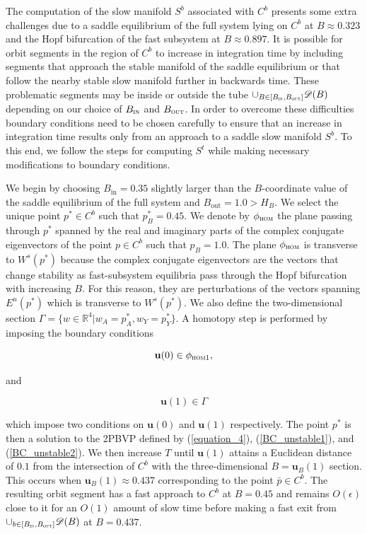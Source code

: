 \documentclass{ws-ijbc}
\begin{document}
The computation of the slow manifold $S^b$ associated with $C^b$ presents some extra challenges due to a saddle equilibrium of the full system lying on $C^b$ at $B \approx 0.323$ and the Hopf bifurcation of the fast subsystem at $B \approx 0.897$.  It is possible for orbit segments in the region of $C^b$ to increase in integration time by including segments that approach the stable manifold of the saddle equilibrium or that follow the nearby stable slow manifold further in backwards time.  These problematic segments may be inside or outside the tube $\cup_{B \in [B_{\textsc{in}},B_{\textsc{out}}]}\mathscr{D}(B)$ depending on our choice of $B_{\textsc{in}}$ and $B_{\textsc{out}}$.  In order to overcome these difficulties boundary conditions need to be chosen carefully to ensure that an increase in integration time results only from an approach to a saddle slow manifold $S^b$.  To this end, we follow the steps for computing $S^t$ while making necessary modifications to boundary conditions.

We begin by choosing $B_{\mathrm{in}} = 0.35$ slightly larger than the $B$-coordinate value of the saddle equilibrium of the full system and $B_{\mathrm{out}}=1.0 > H_B$.  We select the unique point $p^* \in C^b$ such that $p^*_B = 0.45$.  We denote by $\phi_{\textsc{hom}}$ the plane passing through $p^*$ spanned by the real and imaginary parts of the complex conjugate eigenvectors of the point $p \in C^b$ such that $p_B=1.0$.  The plane $\phi_{\textsc{hom}}$ is transverse to $W^s(p^*)$ because the complex conjugate eigenvectors are the vectors that change stability as fast-subsystem equilibria pass through the Hopf bifurcation with increasing $B$.  For this reason, they are perturbations of the vectors spanning $E^u(p^*)$ which is transverse to $W^s(p^*)$.  We also define the two-dimensional section $\Gamma = \{ w \in \mathbb{R}^4 | w_A=p^*_A, w_Y=p^*_Y \}$.  A homotopy step is performed by imposing the boundary conditions

\begin{equation}
\mathbf{u}(0) \in \phi_{\textsc{hom1}},
\label{BC_unstable1}
\end{equation}

and

\begin{equation}
\mathbf{u}(1) \in \Gamma
\label{BC_unstable2}
\end{equation}

\noindent
which impose two conditions on $\mathbf{u}(0)$ and $\mathbf{u}(1)$ respectively.  The point $p^*$ is then a solution to the 2PBVP defined by (\ref{equation_4}), (\ref{BC_unstable1}), and (\ref{BC_unstable2}).  We then increase $T$ until $\mathbf{u}(1)$ attains a Euclidean distance of $0.1$ from the intersection of $C^b$ with the three-dimensional $B = \mathbf{u}_B(1)$ section.  This occurs when $ \mathbf{u}_B(1) \approx 0.437$ corresponding to the point $\bar{p} \in C^b$.  The resulting orbit segment has a fast approach to $C^b$ at $B=0.45$ and remains $O(\epsilon)$ close to it for an $O(1)$ amount of slow time before making a fast exit from $\cup_{b\in[B_{\textsc{in}}, B_{\textsc{out}}]} \mathscr{D}(B)$ at $B=0.437$.
\end{document}
